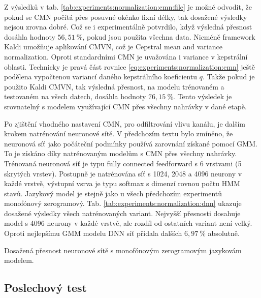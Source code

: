 Z výsledků v tab. \ref{tab:experiments:normalization:cmn:file} je možné odvodit, že pokud se CMN počítá přes posuvné okénko fixní délky, tak dosažené výsledky nejsou zrovna dobré. Což se i experimentálně potvrdilo, když výsledná přesnost dosáhla hodnoty $56,51\ \%$, pokud jsou použita všechna data. Nicméně framework Kaldi umožňuje aplikování CMVN, což je Cepstral mean and variance normalization. Oproti standardními CMN je uvažována i variance v kepstrální oblasti. Technicky je pravá část rovnice \ref{eq:experiments:normalization:cmn} ještě podělena vypočtenou variancí daného kepstrálního koeficientu $q$. Takže pokud je použito Kaldi CMVN, tak výsledná přesnost, na modelu trénovaném a testovaném na všech datech, dosáhla hodnoty $76,15\ \%$. Tento výsledek je srovnatelný s modelem využívající CMN přes všechny nahrávky v dané etapě.

Po zjištění vhodného nastavení CMN, pro odfiltrování vlivu kanálu, je dalším krokem natrénování neuronové sítě. V předchozím textu bylo zmíněno, že neuronová síť jako počáteční podmínky používá zarovnání získané pomocí GMM. To je získáno díky natrénovaným modelům s CMN přes všechny nahrávky. Trénovaná neuronová síť je typu fully connected feedforward s 6 vrstvami (5 skrytých vrstev). Postupně je natrénována síť s 1024, 2048 a 4096 neurony v každé vrstvě, výstupní vsrva je typu softmax s dimenzí rovnou počtu HMM stavů. Jazykový model je stejně jako u všech předchozím experimentů monofónový zerogramový. Tab. \ref{tab:experiments:normalization:dnn} ukazuje dosažené výsledky všech natrénovaných variant. Nejvyšší přesnosti dosahuje model s 4096 neurony v každé vrstvě, ale rozdíl od ostatních variant není velký. Oproti nejlepšímu GMM modelu DNN síť přidala dalších $6,97\ \%$ absolutně.

\begin{table}[htpb]
  \centering
  \def\arraystretch{1.5}
  \caption{Dosažená přesnost neuronové sítě s monofónovým zerogramovým jazykovám modelem.}
  \label{tab:experiments:normalization:dnn}
\end{table}

\subsection{Poslechový test}
\label{chap:experiments:normalization:listening}

